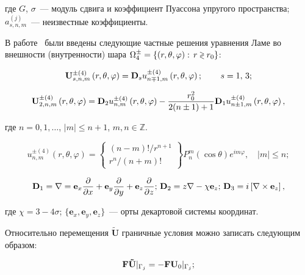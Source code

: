 \noindent где $G$, $\sigma$~--- модуль сдвига и коэффициент Пуассона упругого пространства; $a_{s,n,m}^{(j)}$~--- неизвестные коэффициенты.

В работе~\cite{Nikolaev1984} были введены следующие частные решения уравнения Ламе во внешности (внутренности) шара $\Omega _4^ \pm  = \left\{ {\left( {r,\theta ,\varphi } \right):{\mkern 1mu} {\kern 1pt} r \mathbin{\lower.3ex\hbox{$\buildrel>\over
{\smash{\scriptstyle<}\vphantom{_x}}$}} {r_0}} \right\}$:

\begin{equation}
{\bf{U}}_{s,n,m}^{ \pm (4)}\left( {r,\theta ,\varphi } \right) = {{\bf{D}}_s}u_{n \mp 1,m}^{ \pm (4)}\left( {r,\theta ,\varphi } \right);\qquad {\kern 1pt} s = 1,{\mkern 1mu} {\kern 1pt} 3;
\end{equation}

\begin{equation}
{\bf{U}}_{2,n,m}^{ \pm (4)}\left( {r,\theta ,\varphi } \right) = {{\bf{D}}_2}u_{n,m}^{ \pm (4)}\left( {r,\theta ,\varphi } \right) - \frac{{r_0^2}}{{2(n \pm 1) + 1}}{{\bf{D}}_1}u_{n \pm 1,m}^{ \pm (4)}\left( {r,\theta ,\varphi } \right),
\end{equation}

\noindent где $n=0,1,\dots$, $|m|\le n+1$, $m,n\in\mathbb{Z}$.

\begin{equation}
u_{n,m}^{ \pm (4)}\left( {r,\theta ,\varphi } \right) = \left\{ \begin{array}{l}
(n - m)!/{r^{n + 1}}\\
{r^n}/(n + m)!
\end{array} \right\}P_n^m(\cos \theta ){e^{im\varphi }},\quad |m| \le n;
\end{equation}

\begin{equation*}
{{\bf{D}}_1} = \nabla  = {{\bf{e}}_x}\frac{\partial }{{\partial x}} + {{\bf{e}}_y}\frac{\partial }{{\partial y}} + {{\bf{e}}_z}\frac{\partial }{{\partial z}};\,{{\bf{D}}_2} = z\nabla  - \chi {{\bf{e}}_z};\, {{\bf{D}}_3} = i\left[ {\nabla  \times {{\bf{e}}_z}} \right],
\end{equation*}

\noindent где $\chi=3-4\sigma$; $\{\mathbf{e}_x,\mathbf{e}_y,\mathbf{e}_z\}$~--- орты декартовой системы координат.

Относительно перемещения $\mathbf{\tilde U}$ граничные условия можно записать следующим образом:

\begin{equation}
{\bf{F\tilde U}}{|_{{\Gamma _j}}} =  - {\bf{F}}{{\bf{U}}_0}{|_{{\Gamma _j}}};
\label{eq:8:5}
\end{equation}

